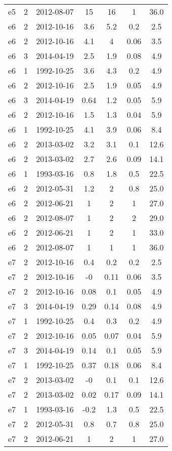 \begin{table*}[htp]
\begin{tabular}{ccccccc}
e5 & 2 & 2012-08-07 & 15 & 16 & 1 & 36.0 \\
e6 & 2 & 2012-10-16 & 3.6 & 5.2 & 0.2 & 2.5 \\
e6 & 2 & 2012-10-16 & 4.1 & 4 & 0.06 & 3.5 \\
e6 & 3 & 2014-04-19 & 2.5 & 1.9 & 0.08 & 4.9 \\
e6 & 1 & 1992-10-25 & 3.6 & 4.3 & 0.2 & 4.9 \\
e6 & 2 & 2012-10-16 & 2.5 & 1.9 & 0.05 & 4.9 \\
e6 & 3 & 2014-04-19 & 0.64 & 1.2 & 0.05 & 5.9 \\
e6 & 2 & 2012-10-16 & 1.5 & 1.3 & 0.04 & 5.9 \\
e6 & 1 & 1992-10-25 & 4.1 & 3.9 & 0.06 & 8.4 \\
e6 & 2 & 2013-03-02 & 3.2 & 3.1 & 0.1 & 12.6 \\
e6 & 2 & 2013-03-02 & 2.7 & 2.6 & 0.09 & 14.1 \\
e6 & 1 & 1993-03-16 & 0.8 & 1.8 & 0.5 & 22.5 \\
e6 & 2 & 2012-05-31 & 1.2 & 2 & 0.8 & 25.0 \\
e6 & 2 & 2012-06-21 & 1 & 2 & 1 & 27.0 \\
e6 & 2 & 2012-08-07 & 1 & 2 & 2 & 29.0 \\
e6 & 2 & 2012-06-21 & 1 & 2 & 1 & 33.0 \\
e6 & 2 & 2012-08-07 & 1 & 1 & 1 & 36.0 \\
e7 & 2 & 2012-10-16 & 0.4 & 0.2 & 0.2 & 2.5 \\
e7 & 2 & 2012-10-16 & -0 & 0.11 & 0.06 & 3.5 \\
e7 & 2 & 2012-10-16 & 0.08 & 0.1 & 0.05 & 4.9 \\
e7 & 3 & 2014-04-19 & 0.29 & 0.14 & 0.08 & 4.9 \\
e7 & 1 & 1992-10-25 & 0.4 & 0.3 & 0.2 & 4.9 \\
e7 & 2 & 2012-10-16 & 0.05 & 0.07 & 0.04 & 5.9 \\
e7 & 3 & 2014-04-19 & 0.14 & 0.1 & 0.05 & 5.9 \\
e7 & 1 & 1992-10-25 & 0.37 & 0.18 & 0.06 & 8.4 \\
e7 & 2 & 2013-03-02 & -0 & 0.1 & 0.1 & 12.6 \\
e7 & 2 & 2013-03-02 & 0.02 & 0.17 & 0.09 & 14.1 \\
e7 & 1 & 1993-03-16 & -0.2 & 1.3 & 0.5 & 22.5 \\
e7 & 2 & 2012-05-31 & 0.8 & 0.7 & 0.8 & 25.0 \\
e7 & 2 & 2012-06-21 & 1 & 2 & 1 & 27.0 \\

\end{tabular}
\end{table*}
